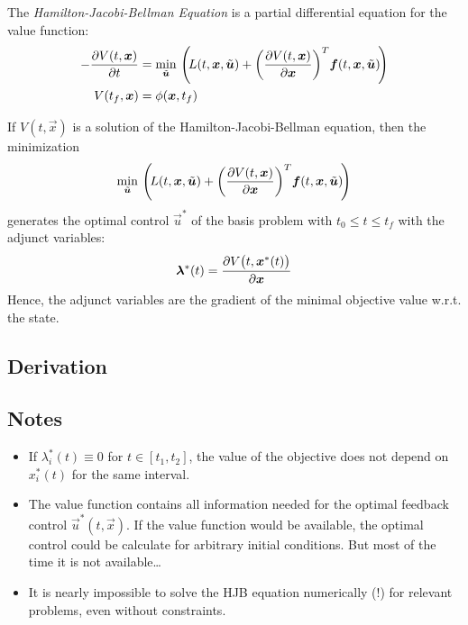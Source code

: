 		The \emph{Hamilton-Jacobi-Bellman Equation} is a partial differential equation for the value function:
		\begin{align*}
			-\pdv{V(t, \bm{x})}{t} & = \min_{\tilde{\bm{u}}} \, \Bigg(\! L(t, \bm{x}, \tilde{\bm{u}}) + \bigg( \pdv{V(t, \bm{x})}{\bm{x}} \bigg)^T \bm{f}(t, \bm{x}, \tilde{\bm{u}}) \!\Bigg) \\
			V(t_f, \bm{x})         & = \phi(\bm{x}, t_f)
		\end{align*}

		If \( V(t, \vec{x}) \) is a solution of the Hamilton-Jacobi-Bellman equation, then the minimization
		\begin{align*}
			\min_{\tilde{\bm{u}}} \, \Bigg(\! L(t, \bm{x}, \tilde{\bm{u}}) + \bigg( \pdv{V(t, \bm{x})}{\bm{x}} \bigg)^T \bm{f}(t, \bm{x}, \tilde{\bm{u}}) \!\Bigg)
		\end{align*}
		generates the optimal control \( \vec{u}^\ast \) of the basis problem with \( t_0 \leq t \leq t_f \) with the adjunct variables:
		\begin{align*}
			\bm{\lambda}^\ast(t) = \pdv{V\big(t, \bm{x}^\ast(t)\big)}{\bm{x}}
		\end{align*}
		Hence, the adjunct variables are the gradient of the minimal objective value w.r.t. the state.

		\subsection{Derivation} %

		\subsection{Notes}
			\begin{itemize}
				\item If \( \lambda_i^\ast(t) \equiv 0 \) for \( t \in [t_1, t_2] \), the value of the objective does not depend on \( x_i^\ast(t) \) for the same interval.
				\item The value function contains all information needed for the optimal feedback control \( \vec{u}^\ast(t, \vec{x}) \). If the value function would be available, the optimal control could be calculate for arbitrary initial conditions. But most of the time it is not available\dots
				\item It is nearly impossible to solve the HJB equation numerically (!) for relevant problems, even without constraints.
			\end{itemize}

